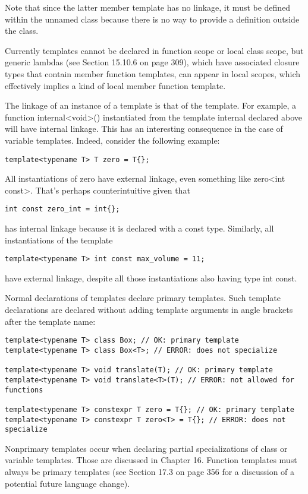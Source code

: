 Note that since the latter member template has no linkage, it must be defined within the unnamed class because there is no way to provide a definition outside the class.

Currently templates cannot be declared in function scope or local class scope, but generic lambdas (see Section 15.10.6 on page 309), which have associated closure types that contain member function templates, can appear in local scopes, which effectively implies a kind of local member function template.

The linkage of an instance of a template is that of the template. For example, a function internal<void>() instantiated from the template internal declared above will have internal linkage. This has an interesting consequence in the case of variable templates. Indeed, consider the following example:

\begin{lstlisting}[style=styleCXX]
template<typename T> T zero = T{};
\end{lstlisting}

All instantiations of zero have external linkage, even something like zero<int const>. That’s perhaps counterintuitive given that

\begin{lstlisting}[style=styleCXX]
int const zero_int = int{};
\end{lstlisting}

has internal linkage because it is declared with a const type. Similarly, all instantiations of the template

\begin{lstlisting}[style=styleCXX]
template<typename T> int const max_volume = 11;
\end{lstlisting}

have external linkage, despite all those instantiations also having type int const.


Normal declarations of templates declare primary templates. Such template declarations are declared without adding template arguments in angle brackets after the template name:

\begin{lstlisting}[style=styleCXX]
template<typename T> class Box; // OK: primary template
template<typename T> class Box<T>; // ERROR: does not specialize

template<typename T> void translate(T); // OK: primary template
template<typename T> void translate<T>(T); // ERROR: not allowed for functions

template<typename T> constexpr T zero = T{}; // OK: primary template
template<typename T> constexpr T zero<T> = T{}; // ERROR: does not specialize
\end{lstlisting}

Nonprimary templates occur when declaring partial specializations of class or variable templates. Those are discussed in Chapter 16. Function templates must always be primary templates (see Section 17.3 on page 356 for a discussion of a potential future language change).


















